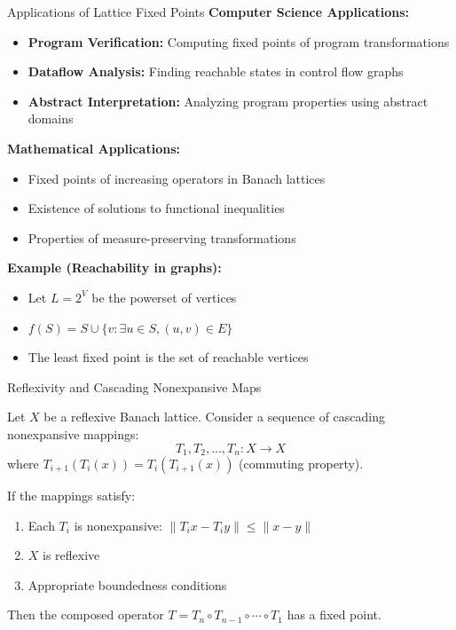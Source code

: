 \documentclass[aspectratio=169,10pt]{beamer}
\begin{document}
\begin{frame}{Applications of Lattice Fixed Points}
    \textbf{Computer Science Applications:}
    \begin{itemize}
        \item \textbf{Program Verification:} Computing fixed points of program transformations
        \item \textbf{Dataflow Analysis:} Finding reachable states in control flow graphs
        \item \textbf{Abstract Interpretation:} Analyzing program properties using abstract domains
    \end{itemize}

    \vspace{0.5cm}
    \textbf{Mathematical Applications:}
    \begin{itemize}
        \item Fixed points of increasing operators in Banach lattices
        \item Existence of solutions to functional inequalities
        \item Properties of measure-preserving transformations
    \end{itemize}

    \vspace{0.5cm}
    \textbf{Example (Reachability in graphs):}
    \begin{itemize}
        \item Let $L = 2^V$ be the powerset of vertices
        \item $f(S) = S \cup \{v : \exists u \in S, (u,v) \in E\}$
        \item The least fixed point is the set of reachable vertices
    \end{itemize}
\end{frame}

\begin{frame}{Reflexivity and Cascading Nonexpansive Maps}
    \begin{theorem}
        Let $X$ be a reflexive Banach lattice. Consider a sequence of cascading nonexpansive mappings:
        \[
            T_1, T_2, \ldots, T_n: X \to X
        \]
        where $T_{i+1}(T_i(x)) = T_i(T_{i+1}(x))$ (commuting property).

        If the mappings satisfy:
        \begin{enumerate}
            \item Each $T_i$ is nonexpansive: $\|T_i x - T_i y\| \leq \|x - y\|$
            \item $X$ is reflexive
            \item Appropriate boundedness conditions
        \end{enumerate}

        Then the composed operator $T = T_n \circ T_{n-1} \circ \cdots \circ T_1$ has a fixed point.
    \end{theorem}
\end{frame}
\end{document}

